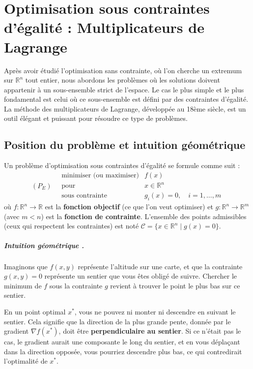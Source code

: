 \documentclass[a4paper,12pt,openany]{book}
\theoremstyle{plain}
\theoremstyle{definition}
\theoremstyle{remark}
\theoremstyle{nbstyle}
\newcommand{\R}{\mathbb{R}}
\newcommand{\grad}{\nabla}
\begin{document}
	
	
	\chapter{Optimisation sous contraintes d'égalité : Multiplicateurs de Lagrange}
	\label{chap:lagrange}
	
	Après avoir étudié l'optimisation sans contrainte, où l'on cherche un extremum sur $\R^n$ tout entier, nous abordons les problèmes où les solutions doivent appartenir à un sous-ensemble strict de l'espace. Le cas le plus simple et le plus fondamental est celui où ce sous-ensemble est défini par des contraintes d'égalité. La méthode des multiplicateurs de Lagrange, développée au 18ème siècle, est un outil élégant et puissant pour résoudre ce type de problèmes.
	
	\section{Position du problème et intuition géométrique}
	
	Un problème d'optimisation sous contraintes d'égalité se formule comme suit :
	$$
	(P_E) \quad
	\begin{array}{ll}
	\text{minimiser (ou maximiser)} & f(x) \\
	\text{pour} & x \in \R^n \\
	\text{sous contrainte} & g_i(x) = 0, \quad i=1, \dots, m
	\end{array}
	$$
	où $f: \R^n \to \R$ est la \textbf{fonction objectif} (ce que l'on veut optimiser) et $g: \R^n \to \R^m$ (avec $m < n$) est la \textbf{fonction de contrainte}. L'ensemble des points admissibles (ceux qui respectent les contraintes) est noté $\mathcal{C} = \{x \in \R^n \mid g(x)=0\}$.
	
	\paragraph{Intuition géométrique .}
	Imaginons que $f(x,y)$ représente l'altitude sur une carte, et que la contrainte $g(x,y)=0$ représente un sentier que vous êtes obligé de suivre. Chercher le minimum de $f$ sous la contrainte $g$ revient à trouver le point le plus bas sur ce sentier.
	
	En un point optimal $x^*$, vous ne pouvez ni monter ni descendre en suivant le sentier. Cela signifie que la direction de la plus grande pente, donnée par le gradient $\grad f(x^*)$, doit être \textbf{perpendiculaire au sentier}. Si ce n'était pas le cas, le gradient aurait une composante le long du sentier, et en vous déplaçant dans la direction opposée, vous pourriez descendre plus bas, ce qui contredirait l'optimalité de $x^*$.
	
\end{document}
